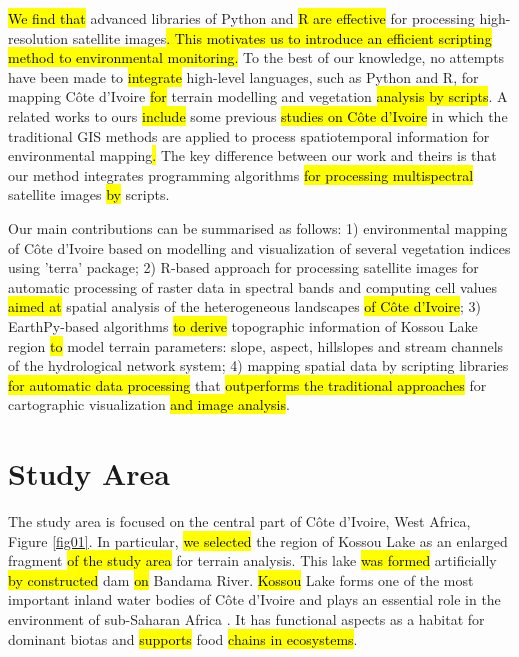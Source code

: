 \documentclass[jimaging,article,submit,pdftex,moreauthors]{Definitions/mdpi}
\begin{document}
\hl{We find that} advanced libraries of Python and\hl{ R are effective} for processing high-resolution satellite images\hl{. This motivates us to introduce an efficient scripting method to environmental monitoring. }To the best of our knowledge, no attempts have been made to \hl{integrate} high-level\hl{ }languages, such as Python and R, for mapping C\^ote d'Ivoire \hl{for} terrain modelling and vegetation \hl{analysis by scripts}. A related works to ours \hl{include} some previous \hl{studies on C\^ote d'Ivoire} \cite{Chatelainetal2010,Hennenberg,ElShahat,Tangetal2016,Affianetal2009} in which the traditional GIS methods are applied to process spatiotemporal information for environmental mapping\hl{. }The key difference between our work and theirs is that our method integrates programming algorithms \hl{for processing multispectral} satellite images \hl{by} scripts.

Our main contributions can be summarised as follows: 1)\hl{ }environmental mapping of C\^ote d'Ivoire based on modelling and visualization of several vegetation indices using 'terra' package; 2)\hl{ }R-based approach for processing satellite images\hl{ }for automatic processing of raster data in spectral bands and computing cell values \hl{aimed at} spatial analysis of the heterogeneous landscapes \hl{of C\^ote d'Ivoire}; 3)\hl{ }EarthPy-based algorithms \hl{to derive} topographic information of Kossou Lake region\hl{ to} model terrain parameters: slope, aspect, hillslopes and stream channels of the hydrological network system; 4) mapping spatial data by scripting libraries \hl{for automatic data processing} that \hl{outperforms the traditional approaches} for cartographic visualization \hl{and image analysis}.  

\section{Study Area}

The study area is focused on the central part of Côte d'Ivoire, West Africa, Figure \ref{fig01}. In particular, \hl{we selected} the region of Kossou Lake\hl{ }as an enlarged fragment \hl{of the study area} for\hl{ }terrain analysis. This lake \hl{was formed} artificially \hl{by constructed} dam \hl{on} Bandama River. \hl{Kossou} Lake forms one of the most important inland water bodies of Côte d'Ivoire and plays an essential\hl{ }role in the environment of sub-Saharan Africa \cite{MSISKA2009487}. It has functional aspects\hl{ }as a habitat for dominant biotas and \hl{supports} food \hl{chains in ecosystems}. 
\end{document}
